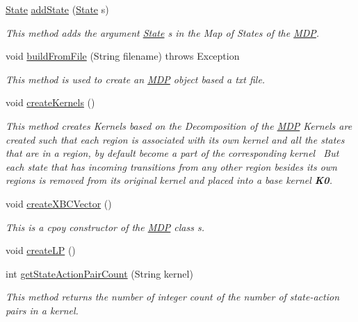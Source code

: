 \begin{DoxyCompactItemize}
\hyperlink{classmdp_1_1core_1_1_state}{State} \hyperlink{classmdp_1_1core_1_1_m_d_p_a0956e730497b8c93b09675990a75f283}{add\+State} (\hyperlink{classmdp_1_1core_1_1_state}{State} s)
\begin{DoxyCompactList}\small\item\em This method adds the argument \hyperlink{classmdp_1_1core_1_1_state}{State} s in the Map of States of the \hyperlink{classmdp_1_1core_1_1_m_d_p}{M\+D\+P}. \end{DoxyCompactList}\item 
void \hyperlink{classmdp_1_1core_1_1_m_d_p_a0565cd0a84c836dd11ba0d13e1eb5ffb}{build\+From\+File} (String filename)  throws Exception 	
\begin{DoxyCompactList}\small\item\em This method is used to create an \hyperlink{classmdp_1_1core_1_1_m_d_p}{M\+D\+P} object based a txt file. \end{DoxyCompactList}\item 
void \hyperlink{classmdp_1_1core_1_1_m_d_p_aa3d7c9f10aff03c993322d3ff7129dfb}{create\+Kernels} ()
\begin{DoxyCompactList}\small\item\em This method creates Kernels based on the Decomposition of the \hyperlink{classmdp_1_1core_1_1_m_d_p}{M\+D\+P} Kernels are created such that each region is associated with its own kernel and all the states that are in a region, by default become a part of the corresponding kernel~\newline
 But each state that has incoming transitions from any other region besides its own regions is removed from its original kernel and placed into a base kernel {\bfseries K0}.~\newline
 \end{DoxyCompactList}\item 
void \hyperlink{classmdp_1_1core_1_1_m_d_p_a669984bc260c8c4fb4c600fb7260030c}{create\+X\+B\+C\+Vector} ()
\begin{DoxyCompactList}\small\item\em This is a cpoy constructor of the \hyperlink{classmdp_1_1core_1_1_m_d_p}{M\+D\+P} class s. \end{DoxyCompactList}\item 
void \hyperlink{classmdp_1_1core_1_1_m_d_p_ab2c6f9846cf9362a472f66e1c7fe4117}{create\+L\+P} ()
\item 
int \hyperlink{classmdp_1_1core_1_1_m_d_p_a597956fa2391fdd8ff1a3266d5e48688}{get\+State\+Action\+Pair\+Count} (String kernel)
\begin{DoxyCompactList}\small\item\em This method returns the number of integer count of the number of state-\/action pairs in a kernel. \end{DoxyCompactList}\item 

\end{DoxyCompactItemize}
